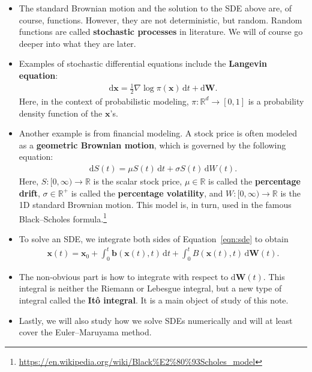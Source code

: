 \documentclass[10pt]{article}
\newcommand{\dee}{\mathrm{d}}
\newcommand{\ve}[1]{\mathbf{#1}}
\newcommand{\Real}{\mathbb{R}}
\begin{document}
\begin{itemize}
  \item The standard Brownian motion and the solution to the SDE above are, of course, functions. However, they are not deterministic, but random. Random functions are called {\bf stochastic processes} in literature. We will of course go deeper into what they are later.

  \item Examples of stochastic differential equations include the {\bf Langevin equation}:
  \begin{align*}
    \dee\ve{x} = \frac{1}{2} \nabla \log \pi(\ve{x})\, \dee t + \dee\ve{W}.
  \end{align*}
  Here, in the context of probabilistic modeling, $\pi: \Real^d \rightarrow [0,1]$ is a probability density function of the $\ve{x}$'s.

  \item Another example is from financial modeling. A stock price is often modeled as a {\bf geometric Brownian motion}, which is governed by the following equation:
  \begin{align*}
    \dee S(t) = \mu S(t)\, \dee t + \sigma S(t)\, \dee W(t).
  \end{align*}
  Here, $S: [0,\infty) \rightarrow \Real$ is the scalar stock price, $\mu \in \Real$ is called the {\bf percentage drift}, $\sigma \in \Real^+$ is called the {\bf percentage volatility}, and $W: [0,\infty) \rightarrow \Real$ is the 1D standard Brownian motion. This model is, in turn, used in the famous Black--Scholes formula.\footnote{\url{https://en.wikipedia.org/wiki/Black\%E2\%80\%93Scholes_model}}

  \item To solve an SDE, we integrate both sides of Equation~\ref{eqn:sde} to obtain
  \begin{align*}
    \ve{x}(t) = \ve{x}_0 + \int_0^t \ve{b}(\ve{x}(t), t)\, \dee t + \int_0^t B(\ve{x}(t), t)\, \dee\ve{W}(t).
  \end{align*}
  
  \item The non-obvious part is how to integrate with respect to $\dee\ve{W}(t)$. This integral is neither the Riemann or Lebesgue integral, but a new type of integral called the {\bf It\^{o} integral}. It is a main object of study of this note.
  
  \item Lastly, we will also study how we solve SDEs numerically and will at least cover the Euler--Maruyama method.
\end{itemize}
\end{document}
